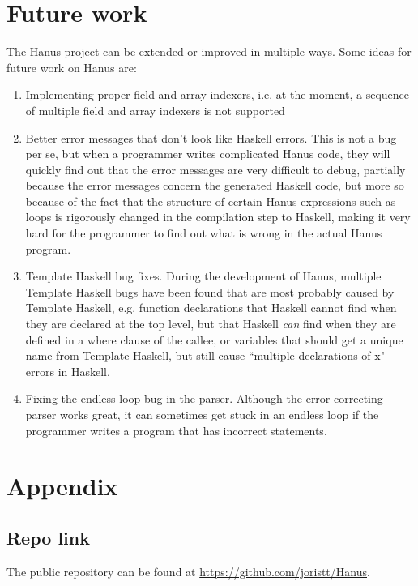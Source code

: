 \documentclass[12pt,a4paper]{article}
\begin{document}
\section{Future work}
\label{section:future}
	The Hanus project can be extended or improved in multiple ways. Some ideas for future work on Hanus are:
        \begin{enumerate}
                	\item Implementing proper field and array indexers, i.e. at the moment, a sequence of multiple field and array indexers is not supported
                	\item Better error messages that don't look like Haskell errors. This is not a bug per se, but when a programmer writes complicated Hanus code, they will quickly find out that the error messages are very difficult to debug, partially because the error messages concern the generated Haskell code, but more so because of the fact that the structure of certain Hanus expressions such as loops is rigorously changed in the compilation step to Haskell, making it very hard for the programmer to find out what is wrong in the actual Hanus program.
                	\item Template Haskell bug fixes. During the development of Hanus, multiple Template Haskell bugs have been found that are most probably caused by Template Haskell, e.g. function declarations that Haskell cannot find when they are declared at the top level, but that Haskell \emph{can} find when they are defined in a where clause of the callee, or variables that should get a unique name from Template Haskell, but still cause ``multiple declarations of x" errors in Haskell.
                	\item Fixing the endless loop bug in the parser. Although the error correcting parser works great, it can sometimes get stuck in an endless loop if the programmer writes a program that has incorrect statements.
        \end{enumerate}

\section{Appendix}
    \subsection{Repo link}
    The public repository can be found at \url{https://github.com/joristt/Hanus}.
\end{document}
